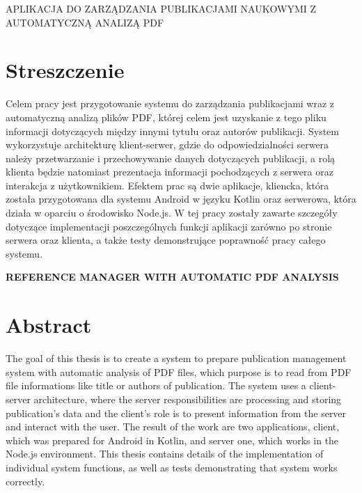 \newpage
\begin{center}
\large \bf

APLIKACJA DO ZARZĄDZANIA PUBLIKACJAMI NAUKOWYMI Z AUTOMATYCZNĄ ANALIZĄ PDF
\end{center}

\section*{Streszczenie}
Celem pracy jest przygotowanie systemu do zarządzania publikacjami wraz z automatyczną analizą plików PDF, której celem jest uzyskanie z tego pliku informacji dotyczących między innymi tytułu oraz autorów publikacji. System wykorzystuje architekturę klient-serwer, gdzie do odpowiedzialności serwera należy przetwarzanie i przechowywanie danych dotyczących publikacji, a rolą klienta będzie natomiast prezentacja informacji pochodzących z serwera oraz interakcja z użytkownikiem. Efektem prac są dwie aplikacje,
kliencka, która została przygotowana dla systemu Android w języku Kotlin oraz serwerowa, która działa w oparciu o środowisko Node.js. W tej pracy zostały zawarte szczegóły dotyczące implementacji poszczególnych funkcji aplikacji zarówno po stronie serwera oraz klienta, a także testy demonstrujące poprawność pracy całego systemu. 



\bigskip

\vskip 2cm


\begin{center}
\large \bf
\uppercase{Reference manager with automatic PDF analysis}
\end{center}

\section*{Abstract}
The goal of this thesis is to create a system to prepare publication management system with automatic analysis of PDF files, which purpose is to read from PDF file informations like title or authors of publication. The system uses a client-server architecture, where the server responsibilities are processing and storing publication's data and the client's role is to present information from the server and interact with the user. The result of the work are two applications,
client, which was prepared for Android in Kotlin, and server one, which works in the Node.js environment. This thesis contains details of the implementation of individual system functions, as well as tests demonstrating that system works correctly. 

\bigskip

\vfill